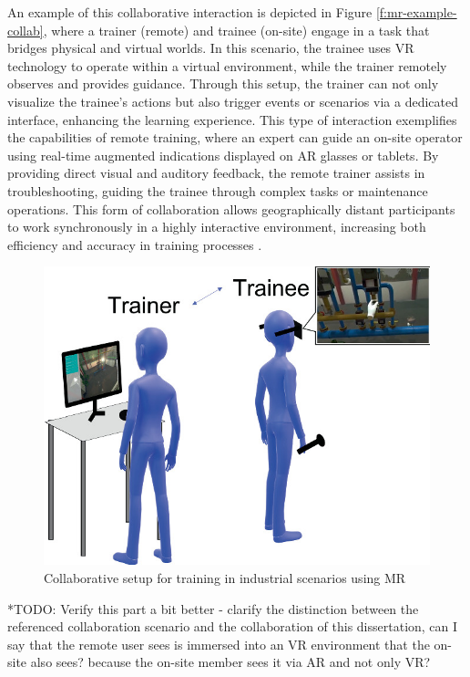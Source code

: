     An example of this collaborative interaction is depicted in Figure \ref{f:mr-example-collab}, where a trainer (remote) and trainee (on-site) engage in a task that bridges physical and virtual worlds. In this scenario, the trainee uses \ac{VR} technology to operate within a virtual environment, while the trainer remotely observes and provides guidance. Through this setup, the trainer can not only visualize the trainee's actions but also trigger events or scenarios via a dedicated interface, enhancing the learning experience. This type of interaction exemplifies the capabilities of remote training, where an expert can guide an on-site operator using real-time augmented indications displayed on \ac{AR} glasses or tablets. By providing direct visual and auditory feedback, the remote trainer assists in troubleshooting, guiding the trainee through complex tasks or maintenance operations. This form of collaboration allows geographically distant participants to work synchronously in a highly interactive environment, increasing both efficiency and accuracy in training processes \cite{Mayer2023}.
  
    \begin{figure}[h]
        \centering
        \includegraphics[width=0.7\linewidth]{figs/mr-example-collab.png}
        \caption{Collaborative setup for training in industrial scenarios using \ac{MR} \cite{Mayer2023}}
        \label{f:mr-collab-example}
    \end{figure}

    *TODO: Verify this part a bit better - clarify the distinction between the referenced collaboration scenario and the collaboration of this dissertation, can I say that the remote user sees is immersed into an VR environment that the on-site also sees? because the on-site member sees it via AR and not only VR? 
    
